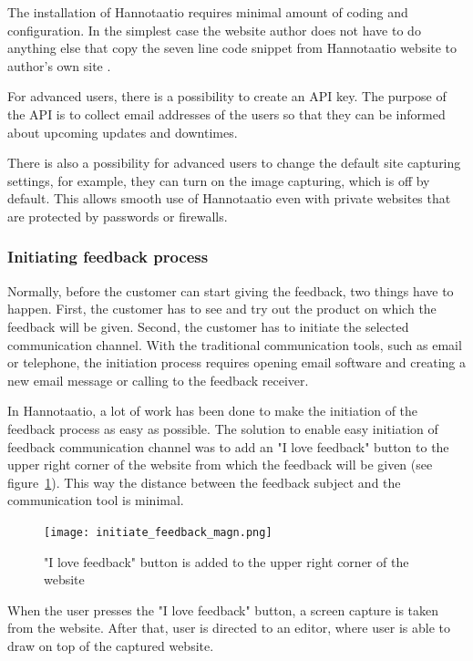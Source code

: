 \documentclass[english,12pt,a4paper,pdftex]{article}
\begin{document}
The installation of Hannotaatio requires minimal amount of coding and configuration. In the simplest case the website author does not have to do anything else that copy the seven line code snippet from Hannotaatio website to author's own site \citep{hannotaatio}.

For advanced users, there is a possibility to create an \ac{API} key. The purpose of the \ac{API} is to collect email addresses of the users so that they can be informed about upcoming updates and downtimes.

There is also a possibility for advanced users to change the default site capturing settings, for example, they can turn on the image capturing, which is off by default. This allows smooth use of Hannotaatio even with private websites that are protected by passwords or firewalls.

\subsubsection{Initiating feedback process}

Normally, before the customer can start giving the feedback, two things have to happen. First, the customer has to see and try out the product on which the feedback will be given. Second, the customer has to initiate the selected communication channel. With the traditional communication tools, such as email or telephone, the initiation process requires opening email software and creating a new email message or calling to the feedback receiver.

In Hannotaatio, a lot of work has been done to make the initiation of the feedback process as easy as possible. The solution to enable easy initiation of feedback communication channel was to add an "I love feedback" button to the upper right corner of the website from which the feedback will be given (see figure~\ref{fig:i_love_feedback}). This way the distance between the feedback subject and the communication tool is minimal.

\begin{figure}[htb]
\begin{center}
\texttt{[image: initiate\_feedback\_magn.png]}
\end{center}
\caption{"I love feedback" button is added to the upper right corner of the website}
\label{fig:i_love_feedback}
\end{figure}

When the user presses the "I love feedback" button, a screen capture is taken from the website. After that, user is directed to an editor, where user is able to draw on top of the captured website.
\end{document}
